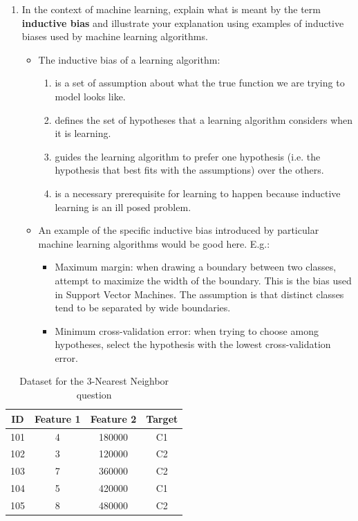 \documentclass[--SOLUTION-OPTION--]{ditpaper}
\begin{document}
\begin{enumerate}
\begin{answer}
\begin{center}
		\end{center}
	\end{answer}
	\item  In the context of machine learning, explain what is meant by the term \textbf{inductive bias} and illustrate your explanation using examples of inductive biases used by machine learning algorithms.
	\begin{answer}
		\begin{itemize}
				\item The inductive bias of a learning algorithm:
				\begin{enumerate}
					\item is a set of assumption about what the true function we are trying to model looks like.
					\item defines the set of hypotheses that a learning algorithm considers when it is learning.
					\item guides the learning algorithm to prefer one hypothesis (i.e. the hypothesis that best fits with the assumptions) over the others. 
					\item is a necessary prerequisite for learning to happen because inductive learning is an ill posed problem. 
				\end{enumerate}	
				\item An example of the specific inductive bias introduced by particular machine learning algorithms would be good here. E.g.:		
				\begin{itemize}
					\item Maximum margin: when drawing a boundary between two classes, attempt to maximize the width of the boundary. This is the bias used in Support Vector Machines. The assumption is that distinct classes tend to be separated by wide boundaries.
					\item Minimum cross-validation error: when trying to choose among hypotheses, select the hypothesis with the lowest cross-validation error.
				\end{itemize}
			\end{itemize}
	\end{answer}
\end{enumerate}


\newpage


\begin{table}[htdp]
\caption{Dataset for the 3-Nearest Neighbor question}
\begin{center}
\begin{tabular}{|c|c|c|c|}
\hline
ID & Feature 1 & Feature 2  & Target \\
\hline
101 & 4 &	180000 & C1\\
102 & 3 &	120000 & C2\\
103 & 7 &	360000 & C2\\
104 & 5 &	420000 &	C1\\
105 & 8 &	480000 &	C2\\
\hline
\end{tabular}
\end{center}
\label{tab:3nn-data}
\end{table}%
\end{document}
